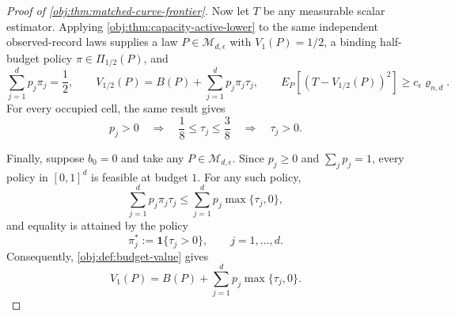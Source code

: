 \documentclass[11pt]{article}
\begin{document}
\begin{proof}[Proof of \cref{obj:thm:matched-curve-frontier}]
Now let \(T\) be any measurable scalar estimator. Applying \cref{obj:thm:capacity-active-lower} to the same independent observed-record laws supplies a law \(P\in\mathcal M_{d,\epsilon}\) with \(V_1(P)=1/2\), a binding half-budget policy \(\pi\in\Pi_{1/2}(P)\), and
\[
\sum_{j=1}^d p_j\pi_j=\frac12,\qquad
V_{1/2}(P)=B(P)+\sum_{j=1}^d p_j\pi_j\tau_j,\qquad
E_P\!\left[(T-V_{1/2}(P))^2\right]\ge c_\epsilon\varrho_{n,d}.
\]
For every occupied cell, the same result gives
\[
p_j>0\quad\Longrightarrow\quad
\frac18\le\tau_j\le\frac38
\quad\Longrightarrow\quad \tau_j>0.
\]

Finally, suppose \(b_0=0\) and take any \(P\in\mathcal M_{d,\epsilon}\). Since \(p_j\ge0\) and \(\sum_jp_j=1\), every policy in \([0,1]^d\) is feasible at budget \(1\). For any such policy,
\[
\sum_{j=1}^d p_j\pi_j\tau_j
\le \sum_{j=1}^d p_j\max\{\tau_j,0\},
\]
and equality is attained by the policy
\[
\pi_j^*:=\mathbf1\{\tau_j>0\},\qquad j=1,\ldots,d.
\]
Consequently, \cref{obj:def:budget-value} gives
\[
V_1(P)=B(P)+\sum_{j=1}^d p_j\max\{\tau_j,0\}.
\]
\end{proof}
\end{document}
